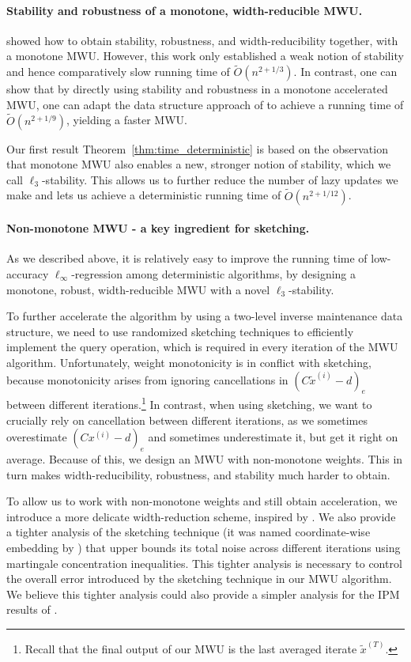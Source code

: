 \documentclass[11pt]{article}
\newcommand\dd{\boldsymbol{\mathit{d}}}
\newcommand\xx{\boldsymbol{\mathit{x}}}
\newcommand\xxtil{\widetilde{\boldsymbol{\mathit{x}}}}
\newcommand\CC{\boldsymbol{\mathit{C}}}
\newcommand\Otil{\widetilde{O}}
\begin{document}
\paragraph{Stability and robustness of a monotone, width-reducible MWU.}
\cite{adil2019iterative} showed how to obtain stability, robustness, and width-reducibility together, with a monotone MWU.
However, this work only established a weak notion of stability 
and hence comparatively slow running time of $\Otil(n^{2+1/3})$.
In contrast, one can show that by directly using stability and robustness in a monotone accelerated MWU, 
one can adapt the data structure approach of \cite{vdB20} to achieve a running time of $\Otil(n^{2+1/9})$, yielding a faster MWU.

Our first result Theorem~\ref{thm:time_deterministic} 
is based on the observation that monotone MWU also enables a new, stronger notion of stability, which we call $\ell_3$-stability.
This allows us to further reduce the number of lazy updates we make and lets us achieve a deterministic running time of $\Otil(n^{2+1/12})$.

\paragraph{Non-monotone MWU - a key ingredient for sketching.}
As we described above, it is relatively easy to improve the running time of low-accuracy $\ell_\infty$-regression among deterministic algorithms, by designing  a monotone, robust, width-reducible MWU with a novel $\ell_3$-stability.

To further accelerate the algorithm by using a two-level inverse maintenance data structure, we need to use randomized sketching techniques to efficiently implement the query operation, which is required in every iteration of the MWU algorithm. 
Unfortunately, weight monotonicity is in conflict with sketching, because monotonicity arises from ignoring cancellations in $(\CC\xxtil^{(i)}-\dd)_e$ between different iterations.\footnote{Recall that the final output of our MWU is the last averaged iterate $\xxtil^{(T)}$.}
In contrast, when using sketching, we want to crucially rely on cancellation between different iterations, as we sometimes overestimate $(\CC\xx^{(i)}-\dd)_e$ and sometimes underestimate it, but get it right on average.
Because of this, we design an MWU with non-monotone weights.
This in turn makes width-reducibility, robustness, and stability much harder to obtain.

To allow us to work with non-monotone weights and still obtain acceleration, we introduce a more delicate width-reduction scheme, inspired by \cite{madry2016computing}.
We also provide a tighter analysis of the sketching technique (it was named coordinate-wise embedding by \cite{lsz19,jiang2021faster}) that upper bounds its total noise across different iterations using martingale concentration inequalities. This tighter analysis is necessary to control the overall error introduced by the sketching technique in our MWU algorithm. We believe this tighter analysis could also provide a simpler analysis for the IPM results of \cite{cohen2021solving,jiang2021faster}.
\end{document}
